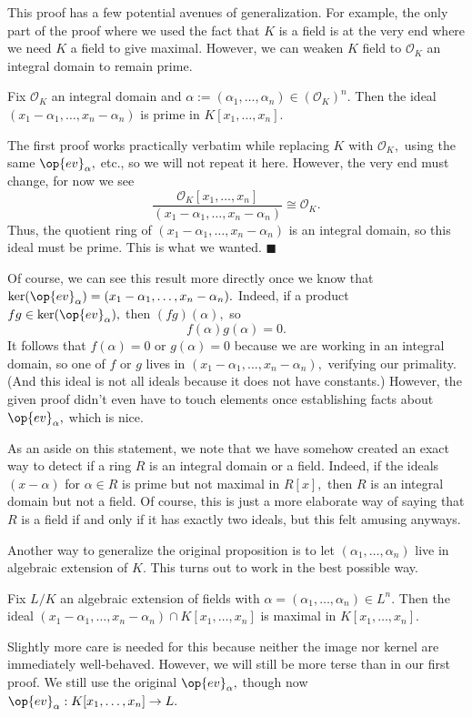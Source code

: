 This proof has a few potential avenues of generalization. For example, the only part of the proof where we used the fact that $K$ is a field is at the very end where we need $K$ a field to give maximal. However, we can weaken $K$ field to $\mathcal O_K$ an integral domain to remain prime.
\begin{proposition}
    Fix $\mathcal O_K$ an integral domain and $\alpha:=(\alpha_1,\ldots,\alpha_n)\in(\mathcal O_K)^n.$ Then the ideal $(x_1-\alpha_1,\ldots,x_n-\alpha_n)$ is prime in $K[x_1,\ldots,x_n].$
\end{proposition}
The first proof works practically verbatim while replacing $K$ with $\mathcal O_K,$ using the same $\op{ev}_\alpha,$ etc., so we will not repeat it here. However, the very end must change, for now we see
\[\frac{\mathcal O_K[x_1,\ldots,x_n]}{(x_1-\alpha_1,\ldots,x_n-\alpha_n)}\cong\mathcal O_K.\]
Thus, the quotient ring of $(x_1-\alpha_1,\ldots,x_n-\alpha_n)$ is an integral domain, so this ideal must be prime. This is what we wanted. $\blacksquare$

Of course, we can see this result more directly once we know that $\ker(\op{ev}_\alpha)=(x_1-\alpha_1,\ldots,x_n-\alpha_n).$ Indeed, if a product $fg\in\ker(\op{ev}_\alpha),$ then $(fg)(\alpha),$ so
\[f(\alpha)g(\alpha)=0.\]
It follows that $f(\alpha)=0$ or $g(\alpha)=0$ because we are working in an integral domain, so one of $f$ or $g$ lives in $(x_1-\alpha_1,\ldots,x_n-\alpha_n),$ verifying our primality. (And this ideal is not all ideals because it does not have constants.) However, the given proof didn't even have to touch elements once establishing facts about $\op{ev}_\alpha,$ which is nice.

As an aside on this statement, we note that we have somehow created an exact way to detect if a ring $R$ is an integral domain or a field. Indeed, if the ideals $(x-\alpha)$ for $\alpha\in R$ is prime but not maximal in $R[x],$ then $R$ is an integral domain but not a field. Of course, this is just a more elaborate way of saying that $R$ is a field if and only if it has exactly two ideals, but this felt amusing anyways.

Another way to generalize the original proposition is to let $(\alpha_1,\ldots,\alpha_n)$ live in algebraic extension of $K.$ This turns out to work in the best possible way.
\begin{proposition}
    Fix $L/K$ an algebraic extension of fields with $\alpha=(\alpha_1,\ldots,\alpha_n)\in L^n.$ Then the ideal $(x_1-\alpha_1,\ldots,x_n-\alpha_n)\cap K[x_1,\ldots,x_n]$ is maximal in $K[x_1,\ldots,x_n].$
\end{proposition}
Slightly more care is needed for this because neither the image nor kernel are immediately well-behaved. However, we will still be more terse than in our first proof. We still use the original $\op{ev}_\alpha,$ though now $\op{ev}_\alpha:K[x_1,\ldots,x_n]\to L.$

